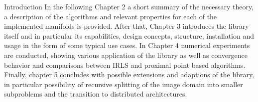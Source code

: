 \begin{chapter}{Introduction}
In the following Chapter 2 a short summary of the necessary theory, a description of the algorithms and relevant properties for each of the implemented manifolds is provided.
After that, Chapter 3 introduces the library itself and in particular its capabilities, design concepts, structure, installation and usage in the form of some typical
use cases. In Chapter 4 numerical experiments are conducted, showing various application of the library as well as convergence behavior and comparisons between 
IRLS and proximal point based algorithms.\\

Finally, chapter 5 concludes with possible extensions and adaptions of the library, in particular possibility of recursive splitting of the image domain into smaller subproblems and
the transition to distributed architectures.
\end{chapter}
